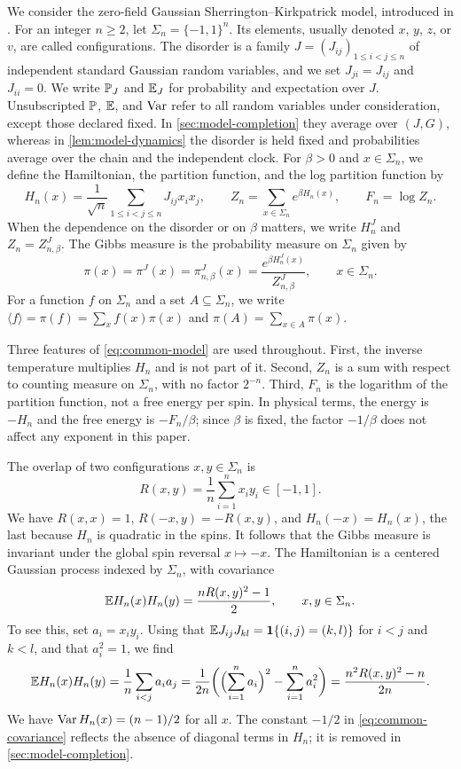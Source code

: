 We consider the zero-field Gaussian Sherrington--Kirkpatrick model, introduced in \cite{sk-original}.
For an integer $n\ge2$, let $\Sigma_n=\{-1,1\}^n$. Its elements, usually denoted $x$, $y$, $z$, or $v$, are called configurations.
The disorder is a family $J=(J_{ij})_{1\le i<j\le n}$ of independent standard Gaussian random variables, and we set $J_{ji}=J_{ij}$ and $J_{ii}=0$. We write $\mathbb P_J$ and $\mathbb E_J$ for probability and expectation over $J$. Unsubscripted $\mathbb P$, $\mathbb E$, and $\operatorname{Var}$ refer to all random variables under consideration, except those declared fixed. In \cref{sec:model-completion} they average over $(J,G)$, whereas in \cref{lem:model-dynamics} the disorder is held fixed and probabilities average over the chain and the independent clock.
For $\beta>0$ and $x\in\Sigma_n$, we define the Hamiltonian, the partition function, and the log partition function by
\begin{equation}\label{eq:common-model}
 H_n(x)=\frac1{\sqrt n}\sum_{1\le i<j\le n}J_{ij}x_ix_j,\qquad
 Z_n=\sum_{x\in\Sigma_n}e^{\beta H_n(x)},\qquad
 F_n=\log Z_n.
\end{equation}
When the dependence on the disorder or on $\beta$ matters, we write $H_n^J$ and $Z_n=Z_{n,\beta}^J$.
The Gibbs measure is the probability measure on $\Sigma_n$ given by
\begin{equation}\label{b:eq:SK-model}
 \pi(x)=\pi^J(x)=\pi^J_{n,\beta}(x)=\frac{e^{\beta H_n^J(x)}}{Z^J_{n,\beta}},\qquad x\in\Sigma_n.
\end{equation}
For a function $f$ on $\Sigma_n$ and a set $A\subseteq\Sigma_n$, we write $\langle f\rangle=\pi(f)=\sum_xf(x)\pi(x)$ and $\pi(A)=\sum_{x\in A}\pi(x)$.

Three features of \eqref{eq:common-model} are used throughout. First, the inverse temperature multiplies $H_n$ and is not part of it. Second, $Z_n$ is a sum with respect to counting measure on $\Sigma_n$, with no factor $2^{-n}$. Third, $F_n$ is the logarithm of the partition function, not a free energy per spin. In physical terms, the energy is $-H_n$ and the free energy is $-F_n/\beta$; since $\beta$ is fixed, the factor $-1/\beta$ does not affect any exponent in this paper.

The overlap of two configurations $x,y\in\Sigma_n$ is
\[
 R(x,y)=\frac1n\sum_{i=1}^nx_iy_i\in[-1,1].
\]
We have $R(x,x)=1$, $R(-x,y)=-R(x,y)$, and $H_n(-x)=H_n(x)$, the last because $H_n$ is quadratic in the spins. It follows that the Gibbs measure is invariant under the global spin reversal $x\mapsto-x$.
The Hamiltonian is a centered Gaussian process indexed by $\Sigma_n$, with covariance
\begin{equation}\label{eq:common-covariance}
 \mathbb E H_n(x)H_n(y)=\frac{nR(x,y)^2-1}{2},\qquad x,y\in\Sigma_n.
\end{equation}
To see this, set $a_i=x_iy_i$. Using that $\mathbb E J_{ij}J_{kl}=\mathbf 1\{(i,j)=(k,l)\}$ for $i<j$ and $k<l$, and that $a_i^2=1$, we find
\[
 \mathbb E H_n(x)H_n(y)=\frac1n\sum_{i<j}a_ia_j
 =\frac1{2n}\biggl(\Bigl(\sum_{i=1}^na_i\Bigr)^2-\sum_{i=1}^na_i^2\biggr)
 =\frac{n^2R(x,y)^2-n}{2n}.
\]
We have $\operatorname{Var} H_n(x)=(n-1)/2$ for all $x$. The constant $-1/2$ in \eqref{eq:common-covariance} reflects the absence of diagonal terms in $H_n$; it is removed in \cref{sec:model-completion}.

